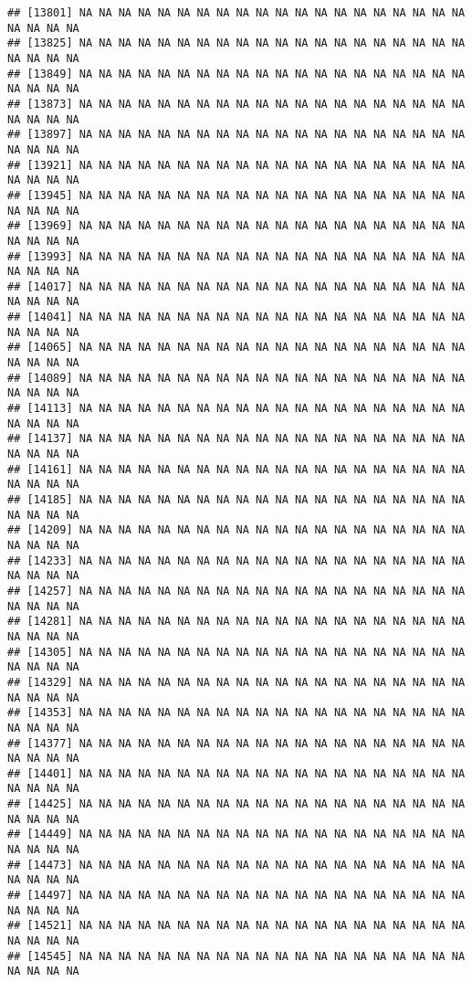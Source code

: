 \documentclass[
]{article}
\begin{document}
\begin{verbatim}
## [13801] NA NA NA NA NA NA NA NA NA NA NA NA NA NA NA NA NA NA NA NA NA NA NA NA
## [13825] NA NA NA NA NA NA NA NA NA NA NA NA NA NA NA NA NA NA NA NA NA NA NA NA
## [13849] NA NA NA NA NA NA NA NA NA NA NA NA NA NA NA NA NA NA NA NA NA NA NA NA
## [13873] NA NA NA NA NA NA NA NA NA NA NA NA NA NA NA NA NA NA NA NA NA NA NA NA
## [13897] NA NA NA NA NA NA NA NA NA NA NA NA NA NA NA NA NA NA NA NA NA NA NA NA
## [13921] NA NA NA NA NA NA NA NA NA NA NA NA NA NA NA NA NA NA NA NA NA NA NA NA
## [13945] NA NA NA NA NA NA NA NA NA NA NA NA NA NA NA NA NA NA NA NA NA NA NA NA
## [13969] NA NA NA NA NA NA NA NA NA NA NA NA NA NA NA NA NA NA NA NA NA NA NA NA
## [13993] NA NA NA NA NA NA NA NA NA NA NA NA NA NA NA NA NA NA NA NA NA NA NA NA
## [14017] NA NA NA NA NA NA NA NA NA NA NA NA NA NA NA NA NA NA NA NA NA NA NA NA
## [14041] NA NA NA NA NA NA NA NA NA NA NA NA NA NA NA NA NA NA NA NA NA NA NA NA
## [14065] NA NA NA NA NA NA NA NA NA NA NA NA NA NA NA NA NA NA NA NA NA NA NA NA
## [14089] NA NA NA NA NA NA NA NA NA NA NA NA NA NA NA NA NA NA NA NA NA NA NA NA
## [14113] NA NA NA NA NA NA NA NA NA NA NA NA NA NA NA NA NA NA NA NA NA NA NA NA
## [14137] NA NA NA NA NA NA NA NA NA NA NA NA NA NA NA NA NA NA NA NA NA NA NA NA
## [14161] NA NA NA NA NA NA NA NA NA NA NA NA NA NA NA NA NA NA NA NA NA NA NA NA
## [14185] NA NA NA NA NA NA NA NA NA NA NA NA NA NA NA NA NA NA NA NA NA NA NA NA
## [14209] NA NA NA NA NA NA NA NA NA NA NA NA NA NA NA NA NA NA NA NA NA NA NA NA
## [14233] NA NA NA NA NA NA NA NA NA NA NA NA NA NA NA NA NA NA NA NA NA NA NA NA
## [14257] NA NA NA NA NA NA NA NA NA NA NA NA NA NA NA NA NA NA NA NA NA NA NA NA
## [14281] NA NA NA NA NA NA NA NA NA NA NA NA NA NA NA NA NA NA NA NA NA NA NA NA
## [14305] NA NA NA NA NA NA NA NA NA NA NA NA NA NA NA NA NA NA NA NA NA NA NA NA
## [14329] NA NA NA NA NA NA NA NA NA NA NA NA NA NA NA NA NA NA NA NA NA NA NA NA
## [14353] NA NA NA NA NA NA NA NA NA NA NA NA NA NA NA NA NA NA NA NA NA NA NA NA
## [14377] NA NA NA NA NA NA NA NA NA NA NA NA NA NA NA NA NA NA NA NA NA NA NA NA
## [14401] NA NA NA NA NA NA NA NA NA NA NA NA NA NA NA NA NA NA NA NA NA NA NA NA
## [14425] NA NA NA NA NA NA NA NA NA NA NA NA NA NA NA NA NA NA NA NA NA NA NA NA
## [14449] NA NA NA NA NA NA NA NA NA NA NA NA NA NA NA NA NA NA NA NA NA NA NA NA
## [14473] NA NA NA NA NA NA NA NA NA NA NA NA NA NA NA NA NA NA NA NA NA NA NA NA
## [14497] NA NA NA NA NA NA NA NA NA NA NA NA NA NA NA NA NA NA NA NA NA NA NA NA
## [14521] NA NA NA NA NA NA NA NA NA NA NA NA NA NA NA NA NA NA NA NA NA NA NA NA
## [14545] NA NA NA NA NA NA NA NA NA NA NA NA NA NA NA NA NA NA NA NA NA NA NA NA

\end{verbatim}
\end{document}
